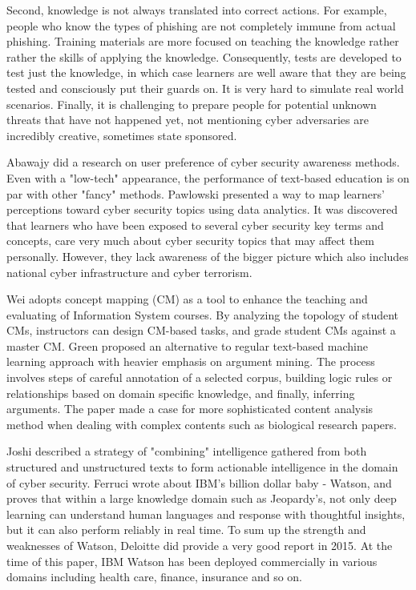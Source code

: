 \documentclass{article} %
\begin{document}
Second, knowledge is not always translated into correct actions. For example, people who know the types of phishing are not completely immune from actual phishing. Training materials are more focused on teaching the knowledge rather rather the skills of applying the knowledge. Consequently, tests are developed to test just the knowledge, in which case learners are well aware that they are being tested and consciously put their guards on. It is very hard to simulate real world scenarios. Finally, it is challenging to prepare people for potential unknown threats that have not happened yet, not mentioning cyber adversaries are incredibly creative, sometimes state sponsored.

Abawajy \cite{Abawajy2014UserMethods} did a research on user preference of cyber security awareness methods. Even with a "low-tech" appearance, the performance of text-based education is on par with other "fancy" methods. Pawlowski \cite{Pawlowski2016SocialDesign} presented a way to map learners' perceptions toward cyber security topics using data analytics. It was discovered that learners who have been exposed to several cyber security key terms and concepts, care very much about cyber security topics that may affect them personally. However, they lack awareness of the bigger picture which also includes national cyber infrastructure and cyber terrorism.

Wei \cite{Wei2017IntegratingAssessment} adopts concept mapping (CM) as a tool to enhance the teaching and evaluating of Information System courses. By analyzing the topology of student CMs, instructors can design CM-based tasks, and grade student CMs against a master CM. Green \cite{Green2018TowardsSchemes} proposed an alternative to regular text-based machine learning approach with heavier emphasis on argument mining. The process involves steps of careful annotation of a selected corpus, building logic rules or relationships based on domain specific knowledge, and finally, inferring arguments. The paper made a case for more sophisticated content analysis method when dealing with complex contents such as biological research papers.

Joshi \cite{Joshi2013ExtractingText} described a strategy of "combining" intelligence gathered from both structured and unstructured texts to form actionable intelligence in the domain of cyber security. Ferruci \cite{Ferrucci2010BuildingProject} wrote about IBM's billion dollar baby - Watson, and proves that within a large knowledge domain such as Jeopardy's, not only deep learning can understand human languages and response with thoughtful insights, but it can also perform reliably in real time. To sum up the strength and weaknesses of Watson, Deloitte did provide a very good report \cite{DeloitteDevelopment2015DisruptionWatson} in 2015. At the time of this paper, IBM Watson has been deployed commercially in various domains including health care, finance, insurance and so on.
\end{document}
